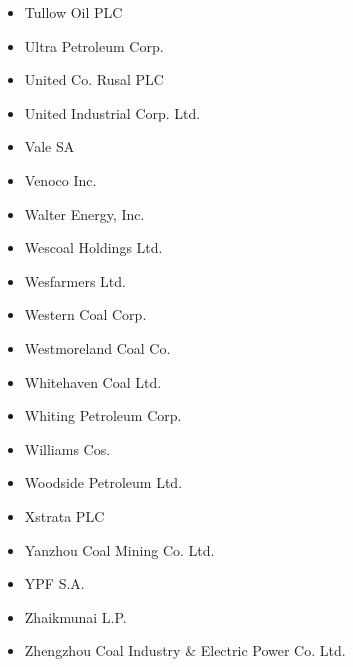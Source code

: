 \begin{itemize}
  \item Tullow Oil PLC
  \item Ultra Petroleum Corp.
  \item United Co. Rusal PLC
  \item United Industrial Corp. Ltd.
  \item Vale SA
  \item Venoco Inc.
  \item Walter Energy, Inc.
  \item Wescoal Holdings Ltd.
  \item Wesfarmers Ltd.
  \item Western Coal Corp.
  \item Westmoreland Coal Co.
  \item Whitehaven Coal Ltd.
  \item Whiting Petroleum Corp.
  \item Williams Cos.
  \item Woodside Petroleum Ltd.
  \item Xstrata PLC
  \item Yanzhou Coal Mining Co. Ltd.
  \item YPF S.A.
  \item Zhaikmunai L.P.
  \item Zhengzhou Coal Industry \& Electric Power Co. Ltd.
\end{itemize}

